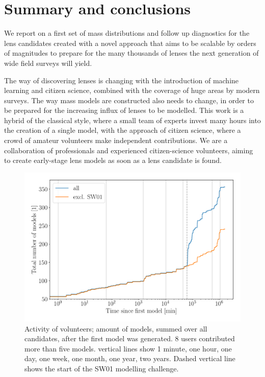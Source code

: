 \section{Summary and conclusions}\label{sec:summary}


We report on a first set of mass distributions and follow up diagnostics for 
the {\SW} lens candidates created with a novel approach that aims to be scalable 
by orders of magnitudes to prepare for the many thousands of lenses the next 
generation of wide field surveys will yield.

The way of discovering lenses is changing with the introduction of
machine learning and citizen science, combined with the coverage of
huge areas by modern surveys.  The way mass models are constructed also needs to
change, in order to be prepared for the increasing influx of lenses to
be modelled.  This work is a hybrid of the classical style, where a
small team of experts invest many hours into the creation of a single
model, with the approach of citizen science, where a crowd of amateur
volunteers make independent contributions.  We are a collaboration of
professionals and experienced citizen-science volunteers, aiming to
create early-stage lens models as soon as a lens candidate is found.

\begin{figure}
  \includegraphics[width=\linewidth]{img/timelapse}
  \caption{Activity of volunteers; amount of models, summed over all candidates, after the first model was generated. 8 users contributed more than five models. vertical lines show 1 minute, one hour, one day, one week, one month, one year, two years. Dashed vertical line shows the start of the SW01 modelling challenge.}
  \label{fig:time}
\end{figure}



